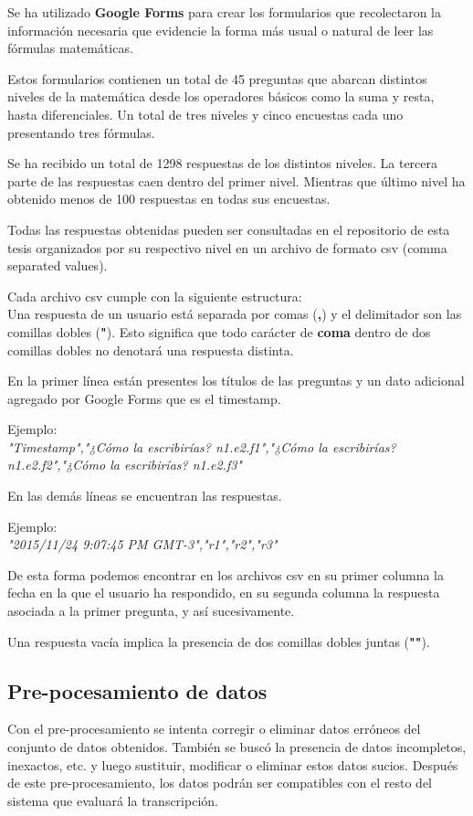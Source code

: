 Se ha utilizado \textbf{Google Forms} para crear los formularios que recolectaron la información necesaria que evidencie la forma más usual o natural de leer las fórmulas matemáticas.

Estos formularios contienen un total de 45 preguntas\cite{10} que abarcan distintos niveles de la matemática desde los operadores básicos como la suma y resta, hasta diferenciales. Un total de tres niveles y cinco encuestas cada uno presentando tres fórmulas.

Se ha recibido un total de 1298 respuestas de los distintos niveles. La tercera parte de las respuestas caen dentro del primer nivel. Mientras que último nivel ha obtenido menos de 100 respuestas en todas sus encuestas.

Todas las respuestas obtenidas pueden ser consultadas en el repositorio de esta tesis organizados por su respectivo nivel en un archivo de formato csv (comma separated values).

Cada archivo csv cumple con la siguiente estructura:\\
Una respuesta de un usuario está separada por comas (\textbf{,}) y el delimitador son las comillas dobles (\textbf{"}). Esto significa que todo carácter de \textbf{coma} dentro de dos comillas dobles no denotará una respuesta distinta.

En la primer línea están presentes los títulos de las preguntas y un dato adicional agregado por Google Forms que es el timestamp.

Ejemplo:\\
\textit{"Timestamp","¿Cómo la escribirías? n1.e2.f1","¿Cómo la escribirías? n1.e2.f2","¿Cómo la escribirías? n1.e2.f3"}

En las demás líneas se encuentran las respuestas.

Ejemplo:\\
\textit{"2015/11/24 9:07:45 PM GMT-3","r1","r2","r3"}

De esta forma podemos encontrar en los archivos csv en su primer columna la fecha en la que el usuario ha respondido, en su segunda columna la respuesta asociada a la primer pregunta, y así sucesivamente.

Una respuesta vacía implica la presencia de dos comillas dobles juntas (\textbf{""}).

\subsection{Pre-pocesamiento de datos}
Con el pre-procesamiento se intenta corregir o eliminar datos erróneos del conjunto de datos obtenidos. También se buscó la presencia de datos incompletos, inexactos, etc. y luego sustituir, modificar o eliminar estos datos sucios. Después de este pre-procesamiento, los datos podrán ser compatibles con el resto del sistema que evaluará la transcripción.


